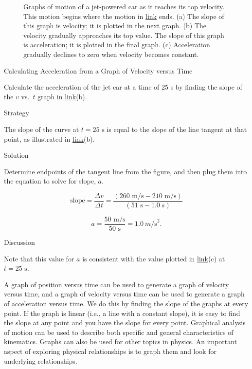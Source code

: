 \documentclass[
]{book}
\begin{document}
\begin{figure}
{\caption{Graphs of motion of a jet-powered car as it reaches its top velocity.
This motion begins where the motion in
\protect\hyperlink{import-auto-id3596921}{link} ends. (a) The
slope of this graph is velocity; it is plotted in the next graph. (b)
The velocity gradually approaches its top value. The slope of this graph
is acceleration; it is plotted in the final graph. (c) Acceleration
gradually declines to zero when velocity becomes
constant.}\label{import-auto-id1534076}
}
\end{figure}

\hypertarget{fs-id1406638}{}
Calculating Acceleration from a Graph of Velocity versus Time

Calculate the acceleration of the jet car at a time of 25 s by finding
the slope of the \(v{}\) vs.~\(t{}\) graph in
\protect\hyperlink{import-auto-id1534076}{link}(b).

{Strategy}

The slope of the curve at \({t = \text{25\ s}}{}\) is equal to the slope
of the line tangent at that point, as illustrated in
\protect\hyperlink{import-auto-id1534076}{link}(b).

{Solution}

Determine endpoints of the tangent line from the figure, and then plug
them into the equation to solve for slope, \(a{}\).

\leavevmode{}%
\[\text{slope} = \frac{\Delta v}{\Delta t} = \frac{\left( {\text{260\ m/s} - \text{210\ m/s}} \right)}{\left( {\text{51\ s} - 1.0\ s} \right)}\]

\leavevmode{}%
\[{{{a = \frac{\text{50\ m/s}}{\text{50\ s}}} = 1}\text{.}0\ m\text{/s}^{2}}.\]

{Discussion}

Note that this value for \(a{}\) is consistent with the value plotted in
\protect\hyperlink{import-auto-id1534076}{link}(c) at
\({t = \text{25\ s}}{}\).

A graph of position versus time can be used to generate a graph of
velocity versus time, and a graph of velocity versus time can be used to
generate a graph of acceleration versus time. We do this by finding the
slope of the graphs at every point. If the graph is linear (i.e., a line
with a constant slope), it is easy to find the slope at any point and
you have the slope for every point. Graphical analysis of motion can be
used to describe both specific and general characteristics of
kinematics. Graphs can also be used for other topics in physics. An
important aspect of exploring physical relationships is to graph them
and look for underlying relationships.
\end{document}
